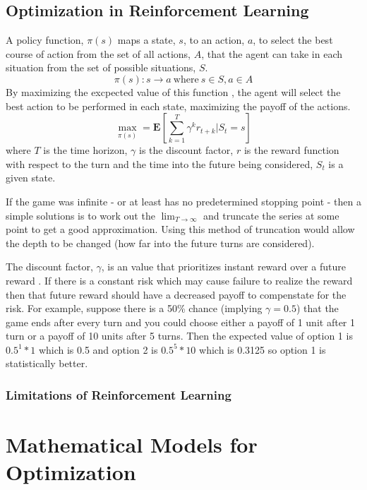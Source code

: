 \documentclass[10pt,a4paper]{report}
\begin{document}
		\section{Optimization in Reinforcement Learning}
			A policy function, $\pi(s)$ maps a state, $s$, to an action, $a$, to select the best course of action from the set of all actions, $A$, that the agent
			can take in each situation from the set of possible situations, $S$.
			\[\pi(s) : s \to a \ \text{where} \ s\in S, a \in A\]
			By maximizing the excpected value of this function \autocite[p. 4]{SurveyOfOptimizationMethods}, the agent will select the
			best action to be performed in each state, maximizing the payoff of the actions.
			\begin{equation}
				\max_{\pi(s)} = \mathbf{E} \left[\sum_{k=1}^{T} \gamma^k r_{t+k} | S_t = s \right]
				\label{eq:reinforcement-learning}
			\end{equation}
			where $T$ is the time horizon, $\gamma$ is the discount factor, $r$ is the reward function with respect to the turn and
			the time into the future being considered, $S_t$ is a given state. \par
			If the game was infinite - or at least has no predetermined stopping point -
			then a simple solutions is to work out the $\lim_{T \to \infty}$ and truncate the series at some point to get a good approximation.
			Using this method of truncation would allow the depth to be changed (how far into the future turns are considered). \par
			The discount factor, $\gamma$, is an value that prioritizes instant reward over a future reward \autocite{sozou1998hyperbolic}.
			If there is a constant risk which may cause failure to realize the reward then that future reward should
			have a decreased payoff to compenstate for the risk. For example, suppose there is a 50\% chance (implying $\gamma = 0.5$) that the game ends after every
			turn and you could choose either a payoff of 1 unit after 1 turn or a payoff of 10 units after 5 turns. Then the expected value of option 1 is
			$0.5^1 * 1$ which is 0.5 and option 2 is $0.5^5 * 10$ which is 0.3125 so option 1 is statistically better.

			\subsection{Limitations of Reinforcement Learning}



	\chapter{Mathematical Models for Optimization}
\end{document}
